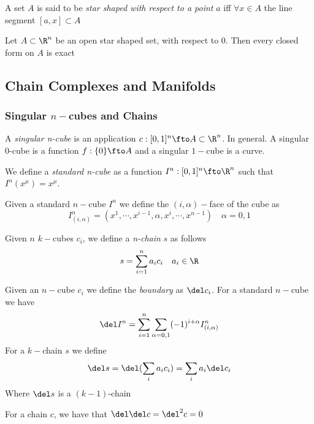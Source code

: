\documentclass[../mmf.tex]{subfiles}
\begin{document}
\begin{dfn}
	A set $A$ is said to be \textit{star shaped with respect to a point} $a$ iff $\forall x\in A$ the line segment $[a,x]\subset A$
\end{dfn}
\begin{lem}[Poincaré's]
	Let $A\subset\R^n$ be an open star shaped set, with respect to 0. Then every closed form on $A$ is exact
\end{lem}
\subsection{Chain Complexes and Manifolds}
\subsubsection{Singular $n-$cubes and Chains}
\begin{dfn}
	A \textit{singular n-cube} is an application $c:[0,1]^n\fto A\subset\R^n$. In general. A singular $0$-cube is a function $f:\{0\}\fto A$ and a singular $1-$cube is a curve.
\end{dfn}
\begin{dfn}
	We define a \textit{standard n-cube} as a function $I^n:[0,1]^n\fto\R^n$ such that $I^n(x^\mu)=x^\mu$.
\end{dfn}
\begin{dfn}[Face]
	Given a standard $n-$cube $I^n$ we define the $(i,\alpha)-$face of the cube as
	\begin{equation}
		I_{(i,\alpha)}^n=(x^1,\cdots,x^{i-1},\alpha,x^i,\cdots,x^{n-1})\quad\alpha=0,1
		\label{eq:iaface}
	\end{equation}
\end{dfn}
\begin{dfn}[Chain]
	Given $n$ $k-$cubes $c_i$, we define a \textit{n-chain} $s$ as follows
	\begin{equation}
		s=\sum_{i=1}^na_ic_i\quad a_i\in\R
		\label{eq:chain}
	\end{equation}
\end{dfn}
\begin{dfn}[Boundary]
	Given an $n-$cube $c_i$ we define the \textit{boundary} as $\del c_i$. For a standard $n-$cube we have
	\begin{equation}
		\del I^n=\sum_{i=1}^n\sum_{\alpha=0,1}(-1)^{i+\alpha}I^n_{(i,\alpha)}
		\label{eq:boundarysncube}
	\end{equation}
	For a $k-$chain $s$ we define
	\begin{equation}
		\del s=\del(\sum_ia_ic_i)=\sum_ia_i\del c_i
		\label{eq:chainboundary}
	\end{equation}
	Where $\del s$ is a $(k-1)$-chain
\end{dfn}
\begin{thm}
	For a chain $c$, we have that $\del\del c=\del^2c=0$
\end{thm}
\end{document}
